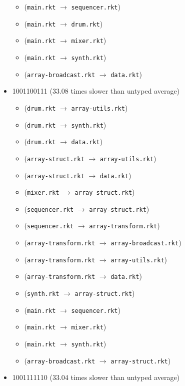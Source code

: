 \documentclass{article}
\newcommand{\mono}[1]{\texttt{#1}}
\begin{document}
\begin{itemize}
\begin{itemize}
  \item (\mono{main.rkt} $\rightarrow$ \mono{sequencer.rkt})
  \item (\mono{main.rkt} $\rightarrow$ \mono{drum.rkt})
  \item (\mono{main.rkt} $\rightarrow$ \mono{mixer.rkt})
  \item (\mono{main.rkt} $\rightarrow$ \mono{synth.rkt})
  \item (\mono{array-broadcast.rkt} $\rightarrow$ \mono{data.rkt})
  \end{itemize}
\item 1001100111 (33.08 times slower than untyped average)
  \begin{itemize}
  \item (\mono{drum.rkt} $\rightarrow$ \mono{array-utils.rkt})
  \item (\mono{drum.rkt} $\rightarrow$ \mono{synth.rkt})
  \item (\mono{drum.rkt} $\rightarrow$ \mono{data.rkt})
  \item (\mono{array-struct.rkt} $\rightarrow$ \mono{array-utils.rkt})
  \item (\mono{array-struct.rkt} $\rightarrow$ \mono{data.rkt})
  \item (\mono{mixer.rkt} $\rightarrow$ \mono{array-struct.rkt})
  \item (\mono{sequencer.rkt} $\rightarrow$ \mono{array-struct.rkt})
  \item (\mono{sequencer.rkt} $\rightarrow$ \mono{array-transform.rkt})
  \item (\mono{array-transform.rkt} $\rightarrow$ \mono{array-broadcast.rkt})
  \item (\mono{array-transform.rkt} $\rightarrow$ \mono{array-utils.rkt})
  \item (\mono{array-transform.rkt} $\rightarrow$ \mono{data.rkt})
  \item (\mono{synth.rkt} $\rightarrow$ \mono{array-struct.rkt})
  \item (\mono{main.rkt} $\rightarrow$ \mono{sequencer.rkt})
  \item (\mono{main.rkt} $\rightarrow$ \mono{mixer.rkt})
  \item (\mono{main.rkt} $\rightarrow$ \mono{synth.rkt})
  \item (\mono{array-broadcast.rkt} $\rightarrow$ \mono{array-struct.rkt})
  \end{itemize}
\item 1001111110 (33.04 times slower than untyped average)
  \begin{itemize}

\end{itemize}
\end{itemize}
\end{document}
